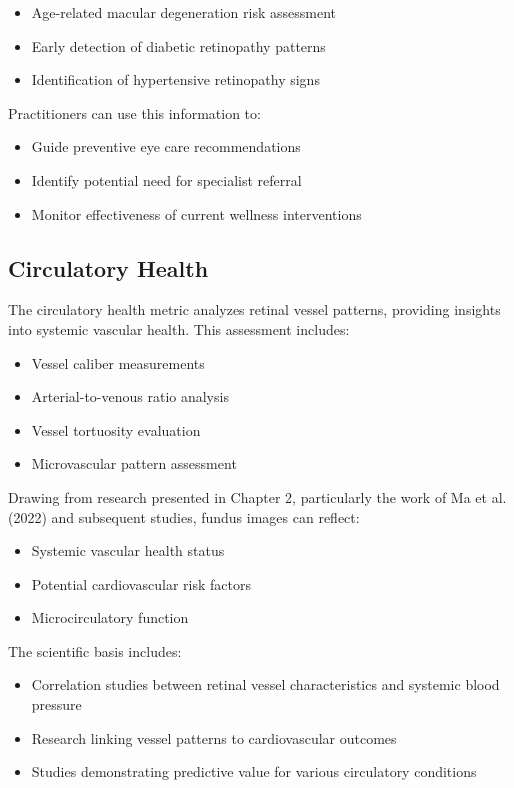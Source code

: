 \documentclass[
  Letterpaper,
]{scrbook}
\providecommand{\tightlist}{%
  \setlength{\itemsep}{0pt}\setlength{\parskip}{0pt}}\usepackage{longtable,booktabs,array}
\begin{document}
\begin{itemize}
\tightlist
\item
  Age-related macular degeneration risk assessment
\item
  Early detection of diabetic retinopathy patterns
\item
  Identification of hypertensive retinopathy signs
\end{itemize}

Practitioners can use this information to:

\begin{itemize}
\tightlist
\item
  Guide preventive eye care recommendations
\item
  Identify potential need for specialist referral
\item
  Monitor effectiveness of current wellness interventions
\end{itemize}

\subsection{Circulatory Health}\label{circulatory-health}

The circulatory health metric analyzes retinal vessel patterns,
providing insights into systemic vascular health. This assessment
includes:

\begin{itemize}
\tightlist
\item
  Vessel caliber measurements
\item
  Arterial-to-venous ratio analysis
\item
  Vessel tortuosity evaluation
\item
  Microvascular pattern assessment
\end{itemize}

Drawing from research presented in Chapter 2, particularly the work of
Ma et al. (2022) and subsequent studies, fundus images can reflect:

\begin{itemize}
\tightlist
\item
  Systemic vascular health status
\item
  Potential cardiovascular risk factors
\item
  Microcirculatory function
\end{itemize}

The scientific basis includes:

\begin{itemize}
\tightlist
\item
  Correlation studies between retinal vessel characteristics and
  systemic blood pressure
\item
  Research linking vessel patterns to cardiovascular outcomes
\item
  Studies demonstrating predictive value for various circulatory
  conditions
\end{itemize}
\end{document}
